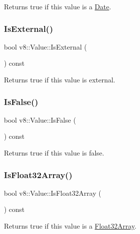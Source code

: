 Returns true if this value is a \mbox{\hyperlink{classv8_1_1Date}{Date}}. \mbox{\label{classv8_1_1Value_a908070323b8cd593127141a22b79e39d}} 
\subsubsection{\texorpdfstring{Is\+External()}{IsExternal()}}
{\footnotesize\ttfamily bool v8\+::\+Value\+::\+Is\+External (\begin{DoxyParamCaption}{ }\end{DoxyParamCaption}) const}

Returns true if this value is external. \mbox{\label{classv8_1_1Value_a84b6682c5582e0ae14d85bd9b6f25522}} 
\subsubsection{\texorpdfstring{Is\+False()}{IsFalse()}}
{\footnotesize\ttfamily bool v8\+::\+Value\+::\+Is\+False (\begin{DoxyParamCaption}{ }\end{DoxyParamCaption}) const}

Returns true if this value is false. \mbox{\label{classv8_1_1Value_aafedbffb06cdd267149f241ad7926d9d}} 
\subsubsection{\texorpdfstring{Is\+Float32\+Array()}{IsFloat32Array()}}
{\footnotesize\ttfamily bool v8\+::\+Value\+::\+Is\+Float32\+Array (\begin{DoxyParamCaption}{ }\end{DoxyParamCaption}) const}

Returns true if this value is a \mbox{\hyperlink{classv8_1_1Float32Array}{Float32\+Array}}. \mbox{\label{classv8_1_1Value_a7ed4de7b1d4467cdd69eb128b3ecfdf2}} 
